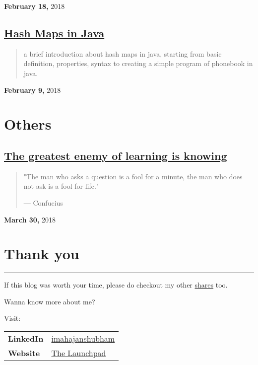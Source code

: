 \documentclass[11pt]{article}
\begin{document}
\textbf{February 18,} 2018

\subsection{\href{https://imahajanshubham.github.io/docs/lang/java/hashmap.html}{Hash Maps in Java}}
\label{sec:org15744ce}
\begin{quote}
a brief introduction about hash maps in java, starting from basic definition,
properties, syntax to creating a simple program of phonebook in java.
\end{quote}

\textbf{February 9,} 2018

\section{Others}
\label{sec:orgd09769e}
\subsection{\href{https://imahajanshubham.github.io/docs/others/words\_to\_cherish.html}{The greatest enemy of learning is knowing}}
\label{sec:orga8de196}
\begin{quote}
"The man who asks a question is a fool for a minute, the man who does not ask is a fool for life."

― Confucius
\end{quote}

\textbf{March 30,} 2018

\section{Thank you}
\label{sec:org9270dd0}
\noindent\rule{\textwidth}{0.5pt}

\begin{attention}
If this blog was worth your time, please do checkout my other \href{https://imahajanshubham.github.io/docs/home.html}{shares} too.
\end{attention}

Wanna know more about me?

Visit:

\begin{center}
\begin{tabular}{ll}
\hline
\textbf{LinkedIn} & \href{https://www.linkedin.com/in/imahajanshubham/}{imahajanshubham}\\
\textbf{Website} & \href{https://sites.google.com/view/the-launchpad/home}{The Launchpad}\\
\hline
\end{tabular}
\end{center}
\end{document}
